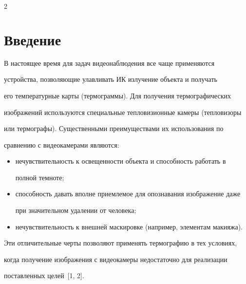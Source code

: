       \begin{multicols}{2}


      


            \label{st\stat}


            








\section{Введение}


  


  В настоящее время для задач видеонаблюдения все чаще применяются 


устройства, позволяющие улавливать ИК излучение объекта и получать 


его температурные карты (термограммы). Для получения термографических 


изображений используются специальные тепловизионные камеры (тепловизоры 


или термографы). Существенными преимуществами их использования по 


сравнению с видеокамерами являются:


  \begin{itemize}


\item нечувствительность к освещенности объекта и способность работать в 


полной темноте;


\item способность давать вполне приемлемое для опознавания изображение даже 


при значительном удалении от человека;


\item нечувствительность к внешней маскировке (например, элементам макияжа).


\end{itemize}





  Эти отличительные черты позволяют применять термографию в тех условиях, 


когда получение изображения с видеокамеры недостаточно для реализации 


поставленных целей~[1, 2].



\end{multicols}
